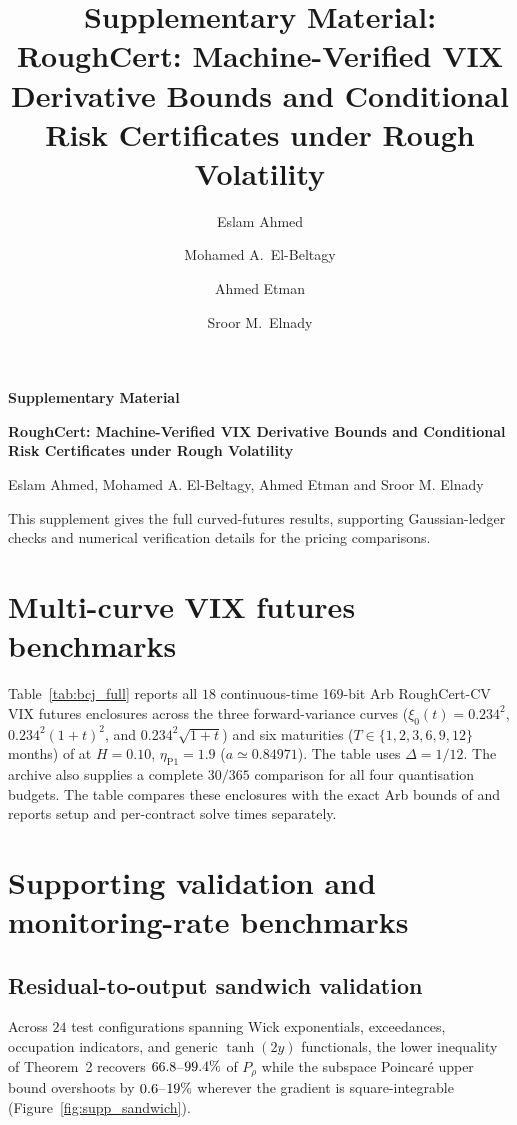 \documentclass[11pt]{article}
\title{\bfseries Supplementary Material:\\ RoughCert: Machine-Verified VIX Derivative Bounds and Conditional Risk Certificates under Rough Volatility}
\author{Eslam Ahmed \and Mohamed A.\ El-Beltagy \and Ahmed Etman \and Sroor M.\ Elnady}
\date{}
\newcommand{\RoughCertCV}{\textsf{RoughCert-CV}}
\begin{document}
\begingroup
\centering
{\Large\bfseries Supplementary Material\par}
\smallskip
{\large\bfseries RoughCert: Machine-Verified VIX Derivative Bounds and Conditional Risk Certificates under Rough Volatility\par}
\medskip
Eslam Ahmed, Mohamed A. El-Beltagy, Ahmed Etman and Sroor M. Elnady\par
\endgroup\medskip

\noindent This supplement gives the full curved-futures results, supporting Gaussian-ledger
checks and numerical verification details for the pricing comparisons.
\renewcommand{\thesection}{S\arabic{section}}
\renewcommand{\thetable}{S\arabic{table}}
\renewcommand{\thefigure}{S\arabic{figure}}

\section{Multi-curve VIX futures benchmarks}\label{sec:supp_bcj}
Table~\ref{tab:bcj_full} reports all $18$ continuous-time 169-bit Arb \RoughCertCV{} VIX futures
enclosures across the three forward-variance curves ($\xi_0(t)=0.234^2$, $0.234^2(1+t)^2$, and
$0.234^2\sqrt{1+t}$) and six maturities ($T\in\{1,2,3,6,9,12\}$ months) of
\citet[Section~5.3]{BonesiniCallegaroJacquier2023} at $H=0.10$, $\eta_{\mathrm{P1}}=1.9$
($a\simeq0.84971$). The table uses $\Delta=1/12$. The archive also supplies a complete $30/365$ comparison for all four quantisation budgets. The table compares these enclosures with the exact Arb bounds of
\citet[Theorem~3.3]{JacquierMartiniMuguruza2018} and reports setup and per-contract solve times separately.
\section{Supporting validation and monitoring-rate benchmarks}\label{sec:supp_val}

\subsection{Residual-to-output sandwich validation}
Across $24$ test configurations spanning Wick exponentials, exceedances, occupation indicators, and
generic $\tanh(2y)$ functionals, the lower inequality of Theorem~2 recovers $66.8$--$99.4\%$ of $P_\rho$
while the subspace Poincar\'e upper bound overshoots by $0.6$--$19\%$ wherever the
gradient is square-integrable (Figure~\ref{fig:supp_sandwich}).
\end{document}
